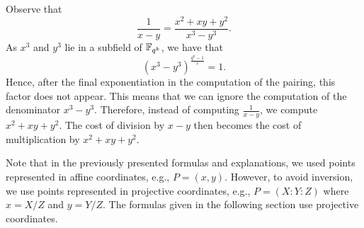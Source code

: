 Observe that
$$ \frac{1}{x-y} = \frac{x^2 + xy + y^2}{x^3 - y^3}. $$
As $x^3$ and $y^3$ lie in a subfield of $\mathbb{F}_{q^k}$, we have that
\[(x^{3} - y^{3})^{\frac{q^{k}-1}{r}} = 1.\]
Hence, after the final exponentiation in the computation of the pairing, this factor does not appear.
This means that we can ignore the computation of the denominator $x^3 - y^3$.
Therefore, instead of computing $\frac{1}{x-y}$, we compute $x^2 + xy + y^2$.
The cost of division by $x - y$ then becomes the cost of multiplication by $x^2 + xy + y^2$.


Note that in the previously presented formulas and explanations,
we used points represented in affine coordinates,
e.g., $P = (x,y)$.
However, to avoid inversion,
we use points represented in projective coordinates,
e.g., $P = (X : Y : Z)$ where $x = X/Z$ and $y = Y/Z$.
The formulas given in the following section use projective coordinates.
